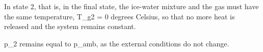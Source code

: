 In state 2, that is, in the final state, the ice-water mixture and the gas must have the same temperature, T_g2 = 0 degrees Celsius, so that no more heat is released and the system remains constant.  

p_2 remains equal to p_amb, as the external conditions do not change.